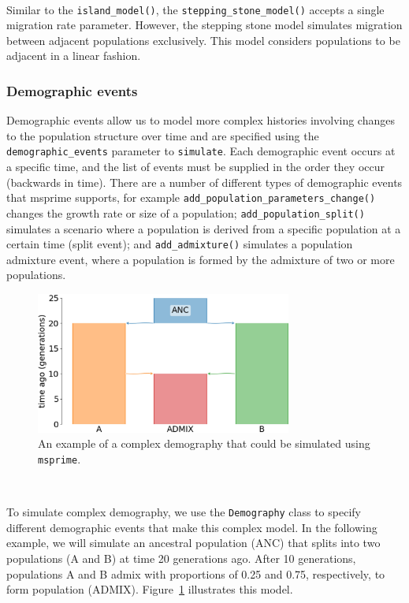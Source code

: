 \documentclass[graybox]{svmult}
\newcommand{\msprime}[0]{\texttt{msprime}}
\begin{document}
\label{stepping-stone-model} \

Similar to the \texttt{island\_model()}, the \texttt{stepping\_stone\_model()}
accepts a single migration rate parameter. However, the stepping stone model simulates
migration between adjacent populations exclusively. This model considers populations to be
adjacent in a linear fashion.

\subsubsection{Demographic events}\label{demographic-events}

Demographic events allow us to model more complex histories involving
changes to the population structure over time and are specified using
the \texttt{demographic\_events} parameter to \texttt{simulate}. Each
demographic event occurs at a specific time, and the list of events must
be supplied in the order they occur (backwards in time). There are a
number of different types of demographic events that msprime supports, for example
\texttt{add\_population\_parameters\_change()} changes the growth rate or size of a population;
\texttt{add\_population\_split()} simulates a scenario where a population is derived from a
specific population at a certain time (split event);
and \texttt{add\_admixture()} simulates a population admixture event, where a population is
formed by the admixture of two or more populations.

\begin{figure}[t]
\centering
\includegraphics[width=0.75\textwidth]{images/admixture.pdf}
\caption{\label{fig:complex-demography} An example of a complex demography that could be
simulated using \msprime.}
\end{figure}

\label{Complex-demography} \

To simulate complex demography, we use the \texttt{Demography} class to specify different
demographic events that make this complex model. In the following example, we will
simulate an ancestral population (ANC) that splits into two populations (A and B) at time
20 generations ago. After 10 generations, populations A and B admix with proportions of 0.25
and 0.75, respectively, to form population (ADMIX). Figure~\ref{fig:complex-demography}
illustrates this model.
\end{document}
